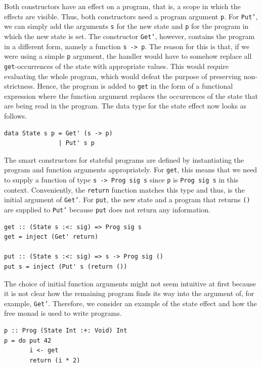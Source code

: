 \documentclass[a4paper, 11pt, fleqn, twoside]{scrreprt}
\newcommand{\hinl}[1]{\texttt{#1}}
\begin{document}
Both constructors have an effect on a program, that is, a scope in which the effects are visible.
Thus, both constructors need a program argument \hinl{p}.
For \hinl{Put'}, we can simply add the arguments \hinl{s} for the new state and \hinl{p} for the program in which the new state is set.
The constructor \hinl{Get'}, however, contains the program in a different form, namely a function \hinl{s -> p}.
The reason for this is that, if we were using a simple \hinl{p} argument, the handler would have to somehow replace all \hinl{get}-occurrences of the state with appropriate values.
This would require evaluating the whole program, which would defeat the purpose of preserving non-strictness.
Hence, the program is added to \hinl{get} in the form of a functional expression where the function argument replaces the occurrences of the state that are being read in the program.
The data type for the state effect now looks as follows.

\begin{verbatim}
data State s p = Get' (s -> p)
               | Put' s p
\end{verbatim}

The smart constructors for stateful programs are defined by instantiating the program and function arguments appropriately.
For \hinl{get}, this means that we need to supply a function of type \hinl{s -> Prog sig s} since \hinl{p} is \hinl{Prog sig s} in this context.
Conveniently, the \hinl{return} function matches this type and thus, is the initial argument of \hinl{Get'}.
For \hinl{put}, the new state and a program that returns \hinl{()} are supplied to \hinl{Put'} because \hinl{put} does not return any information.

\begin{verbatim}
get :: (State s :<: sig) => Prog sig s
get = inject (Get' return)

put :: (State s :<: sig) => s -> Prog sig ()
put s = inject (Put' s (return ())
\end{verbatim}

The choice of initial function arguments might not seem intuitive at first because it is not clear how the remaining program finds its way into the argument of, for example, \hinl{Get'}.
Therefore, we consider an example of the state effect and how the free monad is used to write programs.

\begin{verbatim}
p :: Prog (State Int :+: Void) Int
p = do put 42
       i <- get
       return (i * 2)
\end{verbatim}
\end{document}

